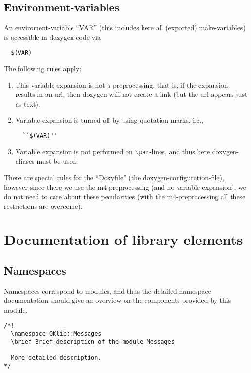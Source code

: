 \documentclass{book}
\begin{document}
\subsection{Environment-variables}
\label{sec:DoxygenGeneraltechnicalitiesEnvironment}

An enviroment-variable ``VAR'' (this includes here all (exported) make-variables) is accessible in doxygen-code via 
\begin{verbatim}
  $(VAR)
\end{verbatim}
The following rules apply:
\begin{enumerate}
\item This variable-expansion is not a preprocessing, that is, if the expansion results in an url, then doxygen will not create a link (but the url appears just as text).
\item Variable-expansion is turned off by using quotation marks, i.e.,
\begin{verbatim}
  ``$(VAR)''
\end{verbatim}
\item Variable expansion is not performed on \texttt{$\backslash$par}-lines, and thus here doxygen-aliases must be used.
\end{enumerate}
There are special rules for the ``Doxyfile'' (the doxygen-configuration-file), however since there we use the m4-preprocessing (and no variable-expansion), we do not need to care about these pecularities (with the m4-preprocessing all these restrictions are overcome).





\section{Documentation of library elements}
\label{sec:Doxygenlibraryelements}

\subsection{Namespaces}
\label{sec:NamespaceDox}

Namespaces correspond to modules, and thus the detailed namespace documentation should give an overview on the components provided by this module.

\begin{verbatim}
/*!
  \namespace OKlib::Messages
  \brief Brief description of the module Messages

  More detailed description.
*/
\end{verbatim}
\end{document}
